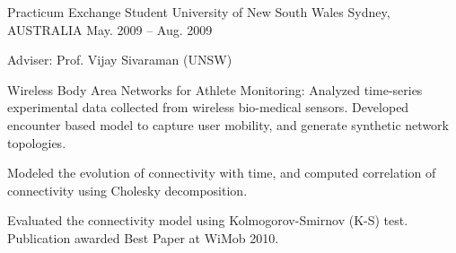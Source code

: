 \begin{cventries}
  \cventry
    {Practicum Exchange Student} %
    {University of New South Wales} %
    {Sydney, AUSTRALIA} %
    {May. 2009 -- Aug. 2009} %
    {
      \begin{cvitems} %
      \item {Adviser: Prof. Vijay Sivaraman (UNSW)}
%      
      \item {Wireless Body Area Networks for Athlete Monitoring: Analyzed time-series experimental data collected from wireless bio-medical sensors. Developed encounter based model to capture user mobility, and generate synthetic network topologies.
      		}
      \item {Modeled the evolution of connectivity with time, and computed correlation of connectivity using Cholesky decomposition.}
      \item {Evaluated the connectivity model using Kolmogorov-Smirnov (K-S) test. Publication awarded Best Paper at WiMob 2010.}
    \end{cvitems}
    }
    
\end{cventries}

%
%
%
%
%
%
